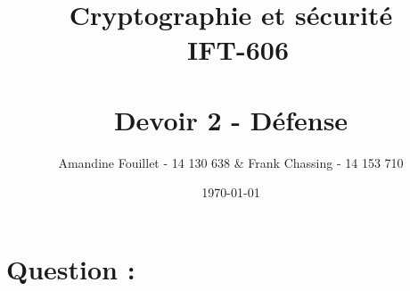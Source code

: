 \documentclass[11pt]{article}
\title{Cryptographie et sécurité \\ ~\textbf{IFT-606} \\~\\ Devoir 2 - Défense}
\author{Amandine Fouillet - 14 130 638 \& Frank Chassing - 14 153 710}
\date{\today}
\begin{document}
\maketitle
\section*{Question : }
\end{document}
